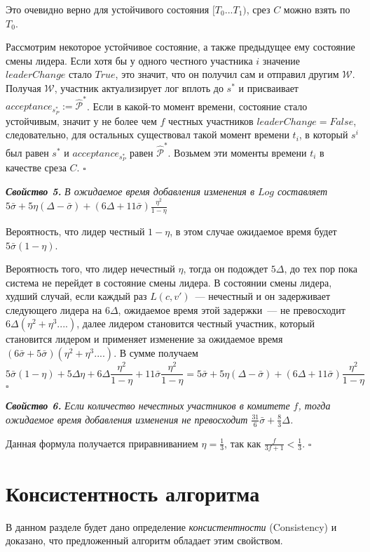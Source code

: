 Это очевидно верно для устойчивого состояния $[T_0...T_1)$, срез $C$ можно взять по $T_0$.

Рассмотрим некоторое устойчивое состояние, а также предыдущее ему состояние смены лидера.
Если хотя бы у одного честного участника $i$ значение $leaderChange$ стало $True$, это значит, что он получил сам и отправил другим $\mathcal{W}$. Получая $\mathcal{W}$, участник актуализирует лог вплоть до $s^{*}$ и присваивает $acceptance_{s_P^{*}} := \hat{\mathcal{P}}^{*}$. Если в какой-то момент времени, состояние стало устойчивым, значит у не более чем $f$ честных участников $leaderChange = False$, следовательно, для остальных существовал такой момент времени $t_i$, в который $s^i$ был равен $s^{*}$ и $acceptance_{s_P^{*}}$ равен $\hat{\mathcal{P}}^{*}$. Возьмем эти моменты времени $t_i$ в качестве среза $C$. $\square$
\vspace{10pt}

\textbf{\textit{Свойство 5.}} \textit{В ожидаемое время добавления изменения в $Log$ составляет $5\bar{\sigma}+5\eta(\Delta-\bar{\sigma})+(6\Delta+11\bar{\sigma})\frac{\eta^2}{1-\eta}$}

Вероятность, что лидер честный $1-\eta$, в этом случае ожидаемое время будет $5\bar{\sigma}(1-\eta)$.

Вероятность того, что лидер нечестный $\eta$, тогда он подождет $5\Delta$, до тех пор пока система не перейдет в состояние смены лидера. В состоянии смены лидера, худший случай, если каждый раз $L(c, v')$~--- нечестный и он задерживает следующего лидера на $6\Delta$, ожидаемое время этой задержки~--- не превосходит $6\Delta(\eta^2+\eta^3....)$, далее лидером становится честный участник, который становится лидером и применяет изменение за ожидаемое время $(6\bar{\sigma}+5\bar{\sigma})(\eta^2+\eta^3....)$. В сумме получаем
$$5\bar{\sigma}(1-\eta)+5\Delta\eta+6\Delta\frac{\eta^2}{1-\eta}+11\bar{\sigma}\frac{\eta^2}{1-\eta}=5\bar{\sigma}+5\eta(\Delta-\bar{\sigma})+(6\Delta+11\bar{\sigma})\frac{\eta^2}{1-\eta}$$
$\square$
\vspace{10pt}

\textbf{\textit{Свойство 6.}} \textit{Если количество нечестных участников в комитете $f$, тогда ожидаемое время добавления изменения не превосходит $\frac{31}{6}\bar{\sigma}+\frac{8}{3}\Delta$.}

Данная формула получается приравниванием $\eta = \frac{1}{3}$, так как $\frac{f}{3f+1} < \frac{1}{3}$.  $\square$

\section{Консистентность алгоритма}
В данном разделе будет дано определение \textit{консистентности} (Consistency)\cite{hybrid-consensus} и доказано, что предложенный алгоритм обладает этим свойством.

